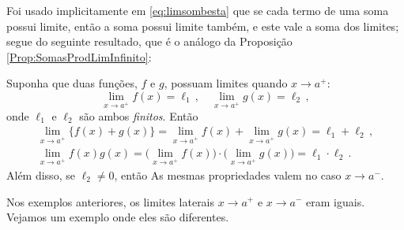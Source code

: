 Foi usado implicitamente em \eqref{eq:limsombesta} que se cada termo de uma soma possui
limite, então a soma possui limite também, e este vale a soma dos limites; segue do
seguinte resultado, que é o análogo da Proposição \ref{Prop:SomasProdLimInfinito}:

\begin{pro}\label{Prop:ProprLimitesparaa}
Suponha que duas funções, $f$ e $g$,
possuam limites quando $x\to a^+$: 
$$\lim_{x\to a^+}f(x)=\ell_1\,,\quad
\lim_{x\to a^+}g(x)=\ell_2\,,$$
onde $\ell_1$ e $\ell_2$ são ambos \emph{finitos}. Então 
\begin{gather}
\lim_{x\to a^+}\{f(x)+g(x)\}=
\lim_{x\to a^+}f(x)+\lim_{x\to a^+}g(x)=\ell_1+\ell_2\,,
\label{eq:proprlima1} \\
\lim_{x\to a^+}f(x)g(x)=
\bigl(\lim_{x\to a^+}f(x)\bigr)\cdot
\bigl(\lim_{x\to a^+}g(x)\bigr)=\ell_1\cdot
\ell_2\,.\label{eq:proprlima2}
\end{gather}
Além disso, se $\ell_2\neq 0$, então
As mesmas propriedades valem no caso $x\to a^-$.
\end{pro}

Nos exemplos anteriores, os limites laterais $x\to a^+$ e $x\to a^-$ eram iguais.
Vejamos um exemplo onde eles são diferentes.

